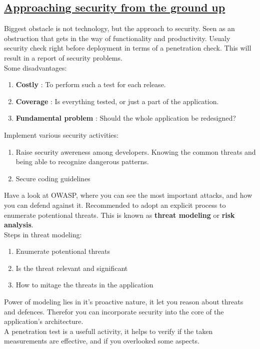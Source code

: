 \documentclass[titlepage]{article}
\begin{document}
    \subsection{\href{https://youtu.be/tcQB-Twzo-Y}{Approaching security from the ground up}}
    Biggest obstacle is not technology, but the approach to security. Seen as an obstruction that gets in the way of functionality and productivity. Usualy security check right before deployment in terms of a penetration check. This will result in a report of security problems.\\
    Some disadvantages:
    \begin{enumerate}
        \item \textbf{Costly} : To perform such a test for each release.
        \item \textbf{Coverage} : Is everything tested, or just a part of the application.
        \item \textbf{Fundamental problem} : Should the whole application be redesigned?
    \end{enumerate}
    Implement various security activities:
    \begin{enumerate}
        \item Raise security awereness among developers. Knowing the common threats and being able to recognize dangerous patterns.
        \item Secure coding guidelines
    \end{enumerate}
    Have a look at OWASP, where you can see the most important attacks, and how you can defend against it.
    Recommended to adopt an explicit process to enumerate potentional threats. This is known as \textbf{threat modeling} or \textbf{risk analysis}.\\
    Steps in threat modeling:
    \begin{enumerate}
        \item Enumerate potentional threats
        \item Is the threat relevant and significant
        \item How to mitage the threats in the application
    \end{enumerate}
    Power of modeling lies in it's proactive nature, it let you reason about threats and defences. Therefor you can incorporate security into the core of the application's architecture.\\
    A penetration test is a usefull activity, it helps to verify if the taken measurements are effective, and if you overlooked some aspects.
\end{document}
